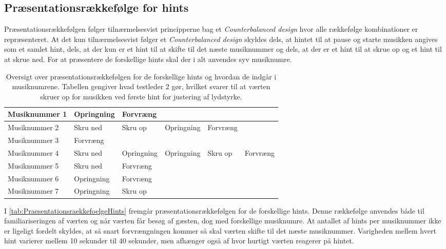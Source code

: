 \subsection{Præsentationsrækkefølge for hints}
\label{PraesentationsraekkefoelgeSocialAccept}
%
Præsentationsrækkefølgen følger tilnærmelsesvist principperne bag et \textit{Counterbalanced design} hvor alle rækkefølge kombinationer er repræsenteret. At det kun tilnærmelsesvist følger et \textit{Counterbalanced design} skyldes dels, at hintet til at pause og starte musikken angives som et samlet hint, dels, at der kun er et hint til at skifte til det næste musiknummer og dels, at der er et hint til at skrue op og et hint til at skrue ned. For at præsentere de forskellige hints skal der i alt anvendes syv musiknumre.
%
\begin{table}[H]
	\centering
	\begin{tabular}{ | p{2.8cm}| p{1.85cm}| p{1.85cm} | p{1.85cm} | p{1.85cm} | p{1.85cm}|}
		\hline
		Musiknummer 1 & Opringning & Forvræng & & & \\ \hline
		Musiknummer 2 & Skru ned & Skru op & Opringning & Forvræng & \\ \hline
		Musiknummer 3 & Forvræng & & & &  \\ \hline
		Musiknummer 4 & Skru ned & Opringning & Opringning & Skru op & Forvræng\\ \hline
		Musiknummer 5 & Skru ned & Forvræng & & & \\ \hline
		Musiknummer 6 & Opringning & Forvræng & & & \\ \hline
		Musiknummer 7 & Opringning & Skru op & & & \\ \hline
	\end{tabular}
	\caption{Oversigt over præsentationsrækkefølgen for de forskellige hints og hvordan de indgår i musiknumrene. Tabellen gengiver hvad testleder 2 gør, hvilket svarer til at værten skruer op for musikken ved første hint for justering af lydstyrke.}
	\label{tab:PraesentationsraekkefoelgeHints}
\end{table}
\noindent
%
I \autoref{tab:PraesentationsraekkefoelgeHints} fremgår præsentationsrækkefølgen for de forskellige hints. Denne rækkefølge anvendes både til familiariseringen af værten og når værten får besøg af gæsten, dog med forskellige musiknumre. At antallet af hints per musiknummer ikke er ligeligt fordelt skyldes, at så snart forvrængningen kommer så skal værten skifte til det næste musiknummer. Varigheden mellem hvert hint varierer mellem 10 sekunder til 40 sekunder, men afhænger også af hvor hurtigt værten reagerer på hintet.   

